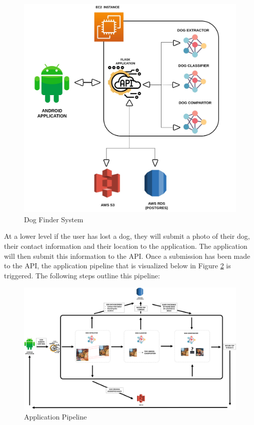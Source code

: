 \documentclass{article}
\begin{document}
\begin{figure}[h]
\centering
	\includegraphics[scale=0.1]{final-report-images/system.jpeg}
\caption{Dog Finder System}
\label{fig:x app system}
\end{figure}

At a lower level if the user has lost a dog, they will submit a photo of their dog, their contact information and their location to the application.  The application will then submit this information to the API.  Once a submission has been made to the API, the application pipeline that is visualized below in Figure \ref{fig:x app pipeline} is triggered.  The following steps outline this pipeline:
\newpage

\begin{figure}[h]
\centering
	\includegraphics[width=1.0\textwidth]{final-report-images/applowlevel.png}
\caption{Application Pipeline}
\label{fig:x app pipeline}
\end{figure}
\end{document}

